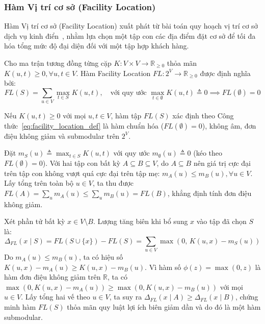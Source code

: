 \subsubsection{Hàm Vị trí cơ sở (Facility Location)}
\label{subsubsec:facility_location_theory}

Hàm Vị trí cơ sở (Facility Location) xuất phát từ bài toán quy hoạch vị trí cơ sở dịch vụ kinh điển~\cite{cornuejols1977uncapacitated}, nhằm lựa chọn một tập con các địa điểm đặt cơ sở để tối đa hóa tổng mức độ đại diện đối với một tập hợp khách hàng.

\begin{dn}
\label{def:facility_location}
Cho ma trận tương đồng từng cặp $K: V \times V \to \mathbb{R}_{\ge 0}$ thỏa mãn $K(u, t) \ge 0, \forall u, t \in V$. Hàm Facility Location $FL: 2^V \to \mathbb{R}_{\ge 0}$ được định nghĩa bởi:
\begin{equation}
\label{eq:facility_location_def}
FL(S) = \sum_{u \in V} \max_{t \in S} K(u, t), \quad \text{với quy ước } \max_{t \in \emptyset} K(u, t) \triangleq 0 \implies FL(\emptyset) = 0
\end{equation}
\end{dn}

\begin{md}
\label{prop:fl_submodular}
Nếu $K(u, t) \ge 0$ với mọi $u, t \in V$, hàm tập $FL(S)$ xác định theo Công thức~\eqref{eq:facility_location_def} là hàm chuẩn hóa ($FL(\emptyset) = 0$), không âm, đơn điệu không giảm và submodular trên $2^V$.
\end{md}

\begin{cm}
Đặt $m_S(u) \triangleq \max_{t \in S} K(u, t)$ với quy ước $m_\emptyset(u) \triangleq 0$ (kéo theo $FL(\emptyset) = 0$). Với hai tập con bất kỳ $A \subseteq B \subseteq V$, do $A \subseteq B$ nên giá trị cực đại trên tập con không vượt quá cực đại trên tập mẹ: $m_A(u) \le m_B(u), \forall u \in V$. Lấy tổng trên toàn bộ $u \in V$, ta thu được $FL(A) = \sum_{u} m_A(u) \le \sum_{u} m_B(u) = FL(B)$, khẳng định tính đơn điệu không giảm.

Xét phần tử bất kỳ $x \in V \setminus B$. Lượng tăng biên khi bổ sung $x$ vào tập đã chọn $S$ là:
\begin{equation}
\Delta_{FL}(x \mid S) = FL(S \cup \{x\}) - FL(S) = \sum_{u \in V} \max\left(0, \, K(u, x) - m_S(u)\right)
\end{equation}
Do $m_A(u) \le m_B(u)$, ta có hiệu số $K(u, x) - m_A(u) \ge K(u, x) - m_B(u)$. Vì hàm số $\phi(z) = \max(0, z)$ là hàm đơn điệu không giảm trên $\mathbb{R}$, ta có $\max\left(0, K(u, x) - m_A(u)\right) \ge \max\left(0, K(u, x) - m_B(u)\right)$ với mọi $u \in V$. Lấy tổng hai vế theo $u \in V$, ta suy ra $\Delta_{FL}(x \mid A) \ge \Delta_{FL}(x \mid B)$, chứng minh hàm $FL(S)$ thỏa mãn quy luật lợi ích biên giảm dần và do đó là một hàm submodular.
\end{cm}

